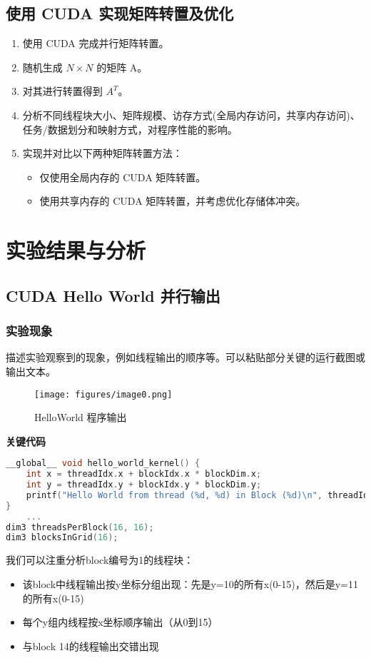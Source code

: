 \documentclass{SYSUReport}
\begin{document}
\subsection{使用 CUDA 实现矩阵转置及优化}
\begin{enumerate}
    \item 使用 CUDA 完成并行矩阵转置。 
    \item 随机生成 $N \times N$ 的矩阵 A。 
    \item 对其进行转置得到 $A^T$。 
    \item 分析不同线程块大小、矩阵规模、访存方式(全局内存访问，共享内存访问)、任务/数据划分和映射方式，对程序性能的影响。 
    \item 实现并对比以下两种矩阵转置方法：
    \begin{itemize}
        \item 仅使用全局内存的 CUDA 矩阵转置。 
        \item 使用共享内存的 CUDA 矩阵转置，并考虑优化存储体冲突。  
    \end{itemize}
\end{enumerate}
\section{实验结果与分析}
\subsection{CUDA Hello World 并行输出}
\subsubsection{实验现象}
描述实验观察到的现象，例如线程输出的顺序等。可以粘贴部分关键的运行截图或输出文本。\\
\begin{figure}
    \centering
    \texttt{[image: figures/image0.png]}
    \caption{HelloWorld 程序输出}
    \label{fig:HelloWorld}
\end{figure}
\textbf{关键代码}
\begin{lstlisting}[language=c]
__global__ void hello_world_kernel() {
    int x = threadIdx.x + blockIdx.x * blockDim.x;
    int y = threadIdx.y + blockIdx.y * blockDim.y;
    printf("Hello World from thread (%d, %d) in Block (%d)\n", threadIdx.x, threadIdx.y, blockIdx.x);
}
    ...
dim3 threadsPerBlock(16, 16);  
dim3 blocksInGrid(16);      
\end{lstlisting}
我们可以注重分析block编号为1的线程块：
\begin{itemize}
    \item 该block中线程输出按y坐标分组出现：先是y=10的所有x(0-15)，然后是y=11的所有x(0-15)
    \item 每个y组内线程按x坐标顺序输出（从0到15）
    \item 与block 14的线程输出交错出现
\end{itemize}
\end{document}
